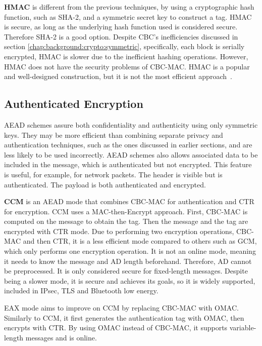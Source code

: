 \textbf{\ac{HMAC}} is different from the previous techniques, by using a cryptographic hash function, such as SHA-2, and a symmetric secret key to construct a tag. \ac{HMAC} is secure, as long as the underlying hash function used is considered secure. Therefore SHA-2 is a good option.
Despite \ac{CBC}'s inefficiencies discussed in section \ref{chap:background:crypto:symmetric}, specifically, each block is serially encrypted, \ac{HMAC} is slower due to the inefficient hashing operations. However, \ac{HMAC} does not have the security problems of \ac{CBC-MAC}. \ac{HMAC} is a popular and well-designed construction, but it is not the most efficient approach~\cite{aesmodes}.


\subsection{Authenticated Encryption}\label{chap:background:crypto:aead}

 \ac{AEAD} schemes assure both confidentiality and authenticity using only symmetric keys. They may be more efficient than combining separate privacy and authentication techniques, such as the ones discussed in earlier sections, and are less likely to be used incorrectly. \ac{AEAD} schemes also allows associated data to be included in the message, which is authenticated but not encrypted. This feature is useful, for example, for network packets. The header is visible but is authenticated. The payload is both authenticated and encrypted. 

\textbf{\ac{CCM}} is an \ac{AEAD} mode that combines \ac{CBC-MAC} for authentication and \ac{CTR} for encryption.
\ac{CCM} uses a MAC-then-Encrypt approach. First, \ac{CBC-MAC} is computed on the message to obtain the tag. Then the message and the tag are encrypted with \ac{CTR} mode.
Due to performing two encryption operations, \ac{CBC-MAC} and then \ac{CTR}, it is a less efficient mode compared to others such as \ac{GCM}, which only performs one encryption operation.
It is not an online mode, meaning it needs to know the message and \ac{AD} length beforehand. Therefore, \ac{AD} cannot be preprocessed. It is only considered secure for fixed-length messages.
Despite being a slower mode, it is secure and achieves its goals, so it is widely supported, included in \ac{IPsec}, \ac{TLS} and Bluetooth low energy.

\ac{EAX} mode aims to improve on \ac{CCM} by replacing \ac{CBC-MAC} with \ac{OMAC}. Similarly to \ac{CCM}, it first generates the authentication tag with \ac{OMAC}, then encrypts with \ac{CTR}.
By using \ac{OMAC} instead of \ac{CBC-MAC}, it supports variable-length messages and is online.

